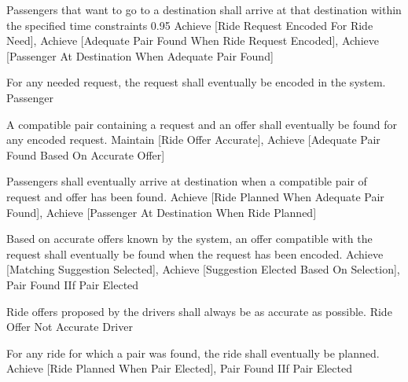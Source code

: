     {}

  \startkaosspec
  	 {Passengers that want to go to a destination shall arrive at that destination within the specified time constraints}
  	 {0.95}
  	 {Achieve [Ride Request Encoded For Ride Need], Achieve [Adequate Pair Found When Ride Request Encoded], Achieve [Passenger At Destination When Adequate Pair Found]}
  \stopkaosspec
  
  \startkaosspec
  	 {For any needed request, the request shall eventually be encoded in the system.}
  	 {Passenger}
  \stopkaosspec
  
  \startkaosspec
  	 {A compatible pair containing a request and an offer shall eventually be found for any encoded request.}
  	 {Maintain [Ride Offer Accurate], Achieve [Adequate Pair Found Based On Accurate Offer]}
  \stopkaosspec
  
  \startkaosspec
  	 {Passengers shall eventually arrive at destination when a compatible pair of request and offer has been found.}
  	 {Achieve [Ride Planned When Adequate Pair Found], Achieve [Passenger At Destination When Ride Planned]}
  \stopkaosspec
  
  \startkaosspec
  	 {Based on accurate offers known by the system, an offer compatible with the request shall eventually be found when the request has been encoded.}
  	 {Achieve [Matching Suggestion Selected], Achieve [Suggestion Elected Based On Selection], Pair Found IIf Pair Elected}
  \stopkaosspec
  
  \startkaosspec
  	 {Ride offers proposed by the drivers shall always be as accurate as possible.}
  	 {Ride Offer Not Accurate}
  	 {Driver}
  \stopkaosspec
  
  \startkaosspec
  	 {For any ride for which a pair was found, the ride shall eventually be planned.}
  	 {Achieve [Ride Planned When Pair Elected], Pair Found IIf Pair Elected}
  \stopkaosspec
  
